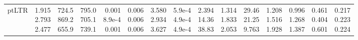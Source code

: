 \begin{landscape}
\begin{table}[t]
{\begin{tabular}{@{}lrrrrrrrrrrrrrr@{}}
ptLTR & \makecell[r]{1.915\\2.793\\2.477} & \makecell[r]{724.5\\869.2\\655.9} & \makecell[r]{795.0\\705.1\\739.1} & \makecell[r]{0.001\\8.9e-4\\0.001} & \makecell[r]{0.006\\0.006\\0.006} & \makecell[r]{3.580\\2.934\\3.627} & \makecell[r]{5.9e-4\\4.9e-4\\4.9e-4} & \makecell[r]{2.394\\14.36\\38.83} & \makecell[r]{1.314\\1.833\\2.053} & \makecell[r]{29.46\\21.25\\9.763} & \makecell[r]{1.208\\1.516\\1.928} & \makecell[r]{0.996\\1.268\\1.387} & \makecell[r]{0.461\\0.404\\0.601} & \makecell[r]{0.217\\0.223\\0.224} \\

\end{tabular}}
\end{table}
\end{landscape}
